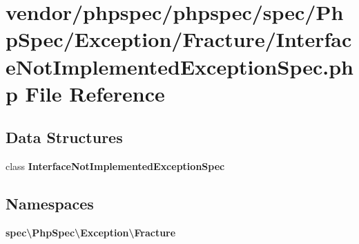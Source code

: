 \section{vendor/phpspec/phpspec/spec/\+Php\+Spec/\+Exception/\+Fracture/\+Interface\+Not\+Implemented\+Exception\+Spec.php File Reference}
\label{_interface_not_implemented_exception_spec_8php}
\subsection*{Data Structures}
\begin{DoxyCompactItemize}
\item 
class {\bf Interface\+Not\+Implemented\+Exception\+Spec}
\end{DoxyCompactItemize}
\subsection*{Namespaces}
\begin{DoxyCompactItemize}
\item 
 {\bf spec\textbackslash{}\+Php\+Spec\textbackslash{}\+Exception\textbackslash{}\+Fracture}
\end{DoxyCompactItemize}
